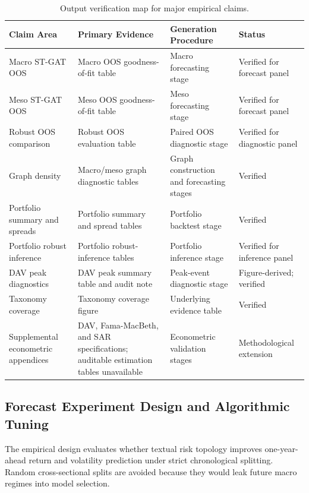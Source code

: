 \documentclass[11pt, a4paper]{article}
\begin{document}
\begin{table}[H]
\centering
\caption{Output verification map for major empirical claims.}
\label{tab:verification_map}
\vspace{0.2cm}
\footnotesize
\renewcommand{\arraystretch}{1.22}
\setlength{\tabcolsep}{3pt}
\begin{tabularx}{\textwidth}{@{}L{2.55cm}Y Y L{2.15cm}@{}}
\toprule
\textbf{Claim Area} & \textbf{Primary Evidence} & \textbf{Generation Procedure} & \textbf{Status} \\
\midrule
Macro ST-GAT OOS &
Macro OOS goodness-of-fit table &
Macro forecasting stage &
Verified for forecast panel \\
Meso ST-GAT OOS &
Meso OOS goodness-of-fit table &
Meso forecasting stage &
Verified for forecast panel \\
Robust OOS comparison &
Robust OOS evaluation table &
Paired OOS diagnostic stage &
Verified for diagnostic panel \\
Graph density &
Macro/meso graph diagnostic tables &
Graph construction and forecasting stages &
Verified \\
Portfolio summary and spreads &
Portfolio summary and spread tables &
Portfolio backtest stage &
Verified \\
Portfolio robust inference &
Portfolio robust-inference tables &
Portfolio inference stage &
Verified for inference panel \\
DAV peak diagnostics &
DAV peak summary table and audit note &
Peak-event diagnostic stage &
Figure-derived; verified \\
Taxonomy coverage &
Taxonomy coverage figure &
Underlying evidence table &
Verified \\
Supplemental econometric appendices &
DAV, Fama-MacBeth, and SAR specifications; auditable estimation tables unavailable &
Econometric validation stages &
Methodological extension \\
\bottomrule
\end{tabularx}
\end{table}

\subsection{Forecast Experiment Design and Algorithmic Tuning}
The empirical design evaluates whether textual risk topology improves one-year-ahead return and volatility prediction under strict chronological splitting. Random cross-sectional splits are avoided because they would leak future macro regimes into model selection.
\end{document}
